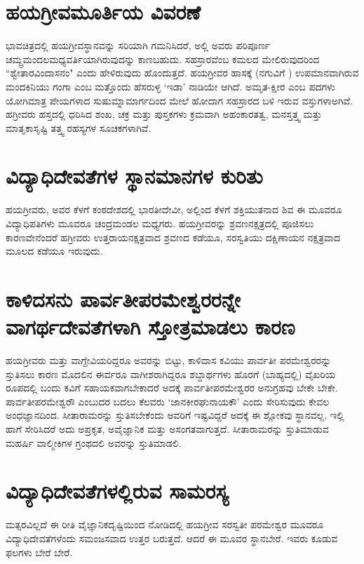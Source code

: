 \section*{ಹಯಗ್ರೀವಮೂರ್ತಿಯ ವಿವರಣೆ}

ಭಾವಚಿತ್ರದಲ್ಲಿ ಹಯಗ್ರೀವಸ್ಥಾನವನ್ನು ಸರಿಯಾಗಿ ಗಮನಿಸಿದರೆ, ಅಲ್ಲಿ ಅವರು ಪರಿಪೂರ್ಣ ಚಮ್ದ್ರಮಂದಲಮಧ್ಯವರ್ತಿಯಾಗಿರುವುದನ್ನು ಕಾಣಬಹುದು. ಸಹಸ್ರಾರವೆಂಬ ಕಮಲದ ಮೇಲಿರುವುದರಿಂದ ``ಶ್ವೇತಾರವಿಂದಾಸನಂ" ಎಂದು ಹೇಳಿರುವುದು ಹೊಂದುತ್ತದೆ. ಹಯಗ್ರೀವರ ಹಾಸಕ್ಕೆ (ನಗುವಿಗೆ ) ಉಪಮಾನವಾಗಿರುವ ಮಂದಕಿನಿಯು ಗಂಗಾ ಎಂಬ ಮತ್ತೊಂದು ಹೆಸರುಳ್ಳ `ಇಡಾ' ನಾಡಿಯೇ ಆಗಿದೆ. ಅಮೃತ-ಕ್ಷೀರ ಎಂಬ ಪದಗಳು ಯೋಗಿಮಾತ್ರ ಪೇಯಗಳಾದ ಸುಷುಮ್ನಾಮಾರ್ಗದಿಂದ ಮೇಲೆ ಹೋದಾಗ ಸಹಸ್ರಾರದ ಬಳಿ ಇರುವ ವಸ್ತುಗಳಾಅಗಿವೆ. ಹಗ್ರೀವರು ಹಸ್ತದಲ್ಲಿ ಧರಿಸಿದ ಶಂಖ, ಚಕ್ರ ಮತ್ತು ಪುಸ್ತಕಗಳು ಕ್ರಮವಾಗಿ ಅಹಂಕಾರತತ್ವ, ಮನಸ್ತತ್ತ್ವ ಮತ್ತು ಮಾತೃಕಾಸೃಷ್ಟಿ ತತ್ತ್ವ ರಹಸ್ಯಗಳ ಸೂಚಕಗಳಾಗಿವೆ.

\section*{ವಿದ್ಯಾಧಿದೇವತೆಗಳ ಸ್ಥಾನಮಾನಗಳ ಕುರಿತು}

ಹಯಗ್ರೀವರು, ಅವರ ಕೆಳಗೆ ಕಂಠದೇಶದಲ್ಲಿ ಭಾರತೀದೇವೀ, ಅಲ್ಲಿಂದ ಕೆಳಗೆ ಶಕ್ತಿಯುತನಾದ ಶಿವ ಈ ಮೂವರೂ ವಿದ್ಯಾಧಿಪತಿಗಳು ಮೂವರೂ ಚಂದ್ರಮಂಡಲ ಮಧ್ಯಗರು. ಹಯಗ್ರೀವರನ್ನು ಶ್ರವಣನಕ್ಷತ್ರದಲ್ಲಿ ಪೂಜಿಸಲು ಕಾರಣವೇನೆಂದರೆ ಹಗ್ರೀವರು ಉತ್ತರಾಯನಕ್ಷತ್ರವಾದ ಶ್ರವಣದ ಕಡೆಯೂ, ಸರಸ್ವತಿಯು ದಕ್ಷಿಣಾಯನ ನಕ್ಷತ್ರವಾದ ಮೂಲದ ಕಡೆಯೂ ಇರುವುದು.

\section*{ಕಾಳಿದಸನು ಪಾರ್ವತೀಪರಮೇಶ್ವರರನ್ನೇ ವಾಗರ್ಥದೇವತೆಗಳಾಗಿ ಸ್ತೋತ್ರಮಾಡಲು ಕಾರಣ}

ಹಯಗ್ರೀವರು ಮತ್ತು ವಾಗ್ದೇವಿಯರಿದ್ದರೂ ಅವರನ್ನು ಬಿಟ್ಟು, ಕಾಳಿದಾಸ ಕವಿಯು ಪಾರ್ವತೀ ಪರಮೇಶ್ವರರನ್ನು ಸ್ತುತಿಸಲು ಕಾರಣ ಮೊದಲಿನ ಈರ್ವರೂ ವಾಗೀಶರಾಗಿದ್ದರೂ ಶಬ್ದಾರ್ಥಗಳು ಹೊರಗೆ (ಬಾಹ್ಯದಲ್ಲಿ) ವೈಖರಿಯ ರೂಪದಲ್ಲಿ ಬಂದು ಕವಿಗೆ ಸಹಾಯಕವಾಗಬೇಕಾದರೆ ಅದಕ್ಕೆ ಪಾರ್ವತೀಪರಮೇಶ್ವರರ ಅನುಗ್ರಹವು ಬೇಕೇ ಬೇಕೇ. ಪಾರ್ವತೀಪರಮೇಶ್ವರೌ ಎಂಬುದರ ಬದಲು ಕೆಲವರು `ಜಾನಕೀರಘುನಾಯಕೌ' ಎಂದು ಸೇರಿಸುವುದು ಕೇವಲ ಅಂಧಜ್ಞಾನದಿಂದ. ಸೀತಾರಾಮರನ್ನು ಸ್ತುತಿಸಬೇಕೆಂದು ಅವರಿಗೆ ಇಷ್ಟವಿದ್ದರೆ ಅದಕ್ಕೆ ಈ ಶ್ಲೋಕವು ಸ್ಥಾನವಲ್ಲ. ಇಲ್ಲಿ ಹಾಗೆ ಸೇರಿಸಿದರೆ ಅದು ಅಪ್ರಕೃತ, ಅವೈಜ್ಞಾನಿಕ ಮತ್ತು ಅಸಂಗತವಾಗುತ್ತದೆ. ಸೀತಾರಾಮರನ್ನು ಸ್ತುತಿಮಾಡುವ ಮಹರ್ಷಿ ವಾಲ್ಮೀಕಿಗಳ ಗ್ರಂಥದಲಿ ಅವರನ್ನು  ಸ್ತುತಿಮಾಡಲಿ.

\section*{ವಿದ್ಯಾಧಿದೇವತೆಗಳಲ್ಲಿರುವ ಸಾಮರಸ್ಯ}

ಮತ್ಸರವಿಲ್ಲದೆ ಈ ರೀತಿ ವೈಜ್ಞಾನಿಕದೃಷ್ಟಿಯಿಂದ ನೋಡಿದಲ್ಲಿ ಹಯಗ್ರೀವ ಸರಸ್ವತೀ ಪರಮೇಶ್ವರ ಮೂವರೂ ವಿದ್ಯಾಧಿದೇವತೆಗಳೆಂದು ಸಮಂಜಸವಾದ ಉತ್ತರ ಬರುತ್ತದೆ. ಆದರೆ ಈ ಮೂವರ ಸ್ಥಾನಬೇರೆ. ಇವರು ಕೂಡುವ ಫಲಗಳು ಬೇರೆ ಬೇರೆ.
 
